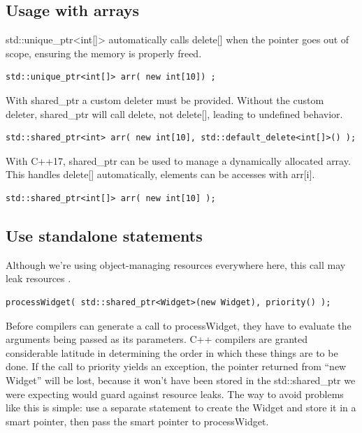 \documentclass[a4paper,12pt,notitlepage]{article}
\begin{document}

\subsection{Usage with arrays}

std::unique\_ptr<int[]> automatically calls delete[] when the pointer goes out of scope, ensuring the
memory is properly freed.

\begin{verbatim}
std::unique_ptr<int[]> arr( new int[10]) ;
\end{verbatim}

With shared\_ptr a custom deleter must be provided. Without the custom deleter, shared\_ptr will call
delete, not delete[], leading to undefined behavior.

\begin{verbatim}
std::shared_ptr<int> arr( new int[10], std::default_delete<int[]>() );
\end{verbatim}

With C++17, shared\_ptr can be used to manage a dynamically allocated array. This handles delete[]
automatically, elements can be accesses with arr[i].

\begin{verbatim}
std::shared_ptr<int[]> arr( new int[10] );
\end{verbatim}


\subsection{Use standalone statements}

Although we're using object-managing resources everywhere here, this call may leak resources 
\cite{Meyers_eff}.

\begin{verbatim}
processWidget( std::shared_ptr<Widget>(new Widget), priority() );
\end{verbatim}

Before compilers can generate a call to processWidget, they have to evaluate the arguments being
passed as its parameters. C++ compilers are granted considerable latitude in determining the order
in which these things are to be done. If the call to priority yields an exception, the pointer
returned from “new Widget” will be lost, because it won't have been stored in the std::shared\_ptr we
were expecting would guard against resource leaks. The way to avoid problems like this is simple:
use a separate statement to create the Widget and store it in a smart pointer, then pass the smart
pointer to processWidget.
\end{document}
